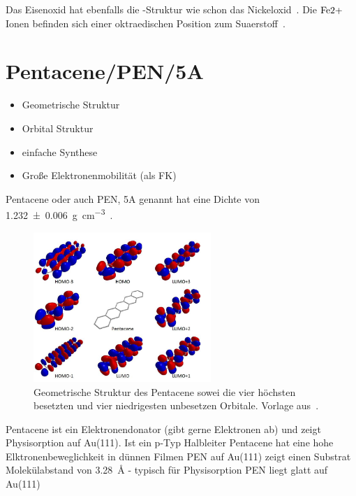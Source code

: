         Das Eisenoxid hat ebenfalls die -Struktur wie schon das Nickeloxid~\cite{FeO_4}.
        Die $\ce{Fe{2+}}$ Ionen befinden sich einer oktraedischen Position zum Suaerstoff~\cite{FeO_4}.

    \section{Pentacene/PEN/5A}
        \begin{itemize}
            \item Geometrische Struktur
            \item Orbital Struktur
            \item einfache Synthese
            \item Große Elektronenmobilität (als FK)
        \end{itemize}
        Pentacene oder auch PEN, 5A genannt hat eine Dichte von \SI{1.232(6)}{\gram\per\cubic\centi\meter}~\cite{CAS}.
        
        \begin{figure}
            \centering
            \includegraphics[width=0.6\textwidth]{./content/PEN.jpg}
            \caption{Geometrische Struktur des Pentacene sowei die vier höchsten besetzten und vier niedrigesten unbesetzen Orbitale. Vorlage aus~\cite{PEN}.}
            \label{fig:PEN}
        \end{figure}
        
        \textbf{\cite{5A_1}}
        Pentacene ist ein Elektronendonator (gibt gerne Elektronen ab) und zeigt Physisorption auf Au(111).
        Ist ein p-Typ Halbleiter
        Pentacene hat eine hohe Elktronenbeweglichkeit in dünnen Filmen
        PEN auf Au(111) zeigt einen Substrat Molekülabstand von \SI{3.28}{\angstrom} - typisch für Physisorption
        PEN liegt glatt auf Au(111)
    